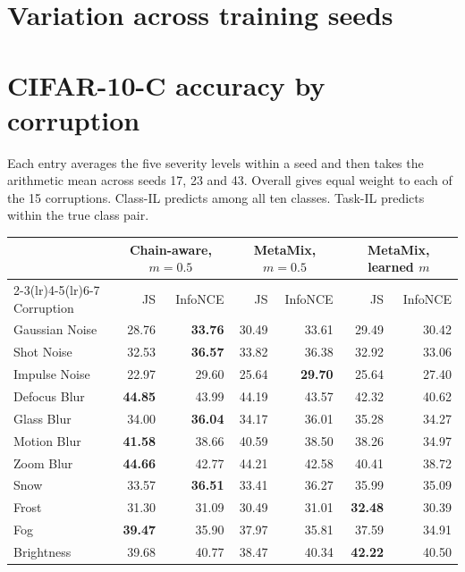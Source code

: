 \documentclass[10pt,twocolumn,letterpaper]{article}
\begin{document}
\section{Variation across training seeds}

\clearpage
\section{CIFAR-10-C accuracy by corruption}
Each entry averages the five severity levels within a seed and then takes the arithmetic mean across seeds 17, 23 and 43. Overall gives equal weight to each of the 15 corruptions. Class-IL predicts among all ten classes. Task-IL predicts within the true class pair.
\begin{table}[h]
      \centering\small
      \begin{tabular}{lrrrrrr}
            \toprule
            & \multicolumn{2}{c}{Chain-aware, $m=0.5$} & \multicolumn{2}{c}{MetaMix, $m=0.5$} & \multicolumn{2}{c}{MetaMix, learned $m$} \\
            \cmidrule(lr){2-3}\cmidrule(lr){4-5}\cmidrule(lr){6-7}
            Corruption & JS & InfoNCE & JS & InfoNCE & JS & InfoNCE \\
            \midrule
            Gaussian Noise & 28.76 & \textbf{33.76} & 30.49 & 33.61 & 29.49 & 30.42 \\
            Shot Noise & 32.53 & \textbf{36.57} & 33.82 & 36.38 & 32.92 & 33.06 \\
            Impulse Noise & 22.97 & 29.60 & 25.64 & \textbf{29.70} & 25.64 & 27.40 \\
            Defocus Blur & \textbf{44.85} & 43.99 & 44.19 & 43.57 & 42.32 & 40.62 \\
            Glass Blur & 34.00 & \textbf{36.04} & 34.17 & 36.01 & 35.28 & 34.27 \\
            Motion Blur & \textbf{41.58} & 38.66 & 40.59 & 38.50 & 38.26 & 34.97 \\
            Zoom Blur & \textbf{44.66} & 42.77 & 44.21 & 42.58 & 40.41 & 38.72 \\
            Snow & 33.57 & \textbf{36.51} & 33.41 & 36.27 & 35.99 & 35.09 \\
            Frost & 31.30 & 31.09 & 30.49 & 31.01 & \textbf{32.48} & 30.39 \\
            Fog & \textbf{39.47} & 35.90 & 37.97 & 35.81 & 37.59 & 34.91 \\
            Brightness & 39.68 & 40.77 & 38.47 & 40.34 & \textbf{42.22} & 40.50 \\

\end{tabular}
\end{table}
\end{document}
